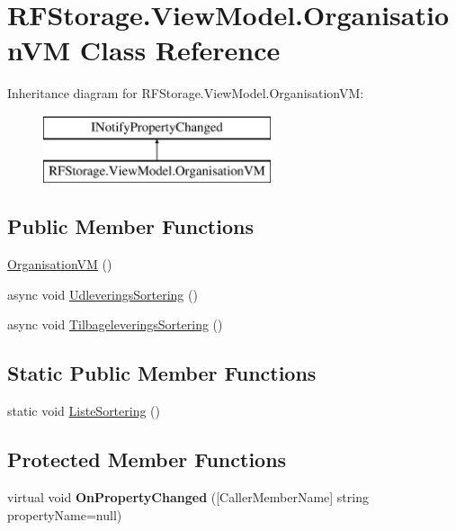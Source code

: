 \hypertarget{class_r_f_storage_1_1_view_model_1_1_organisation_v_m}{}\section{R\+F\+Storage.\+View\+Model.\+Organisation\+VM Class Reference}
\label{class_r_f_storage_1_1_view_model_1_1_organisation_v_m}
Inheritance diagram for R\+F\+Storage.\+View\+Model.\+Organisation\+VM\+:\begin{figure}[H]
\begin{center}
\leavevmode
\includegraphics[height=2.000000cm]{class_r_f_storage_1_1_view_model_1_1_organisation_v_m}
\end{center}
\end{figure}
\subsection*{Public Member Functions}
\begin{DoxyCompactItemize}
\item 
\mbox{\hyperlink{class_r_f_storage_1_1_view_model_1_1_organisation_v_m_ad360a4cd203de421d6ccf82e7745ee52}{Organisation\+VM}} ()
\item 
async void \mbox{\hyperlink{class_r_f_storage_1_1_view_model_1_1_organisation_v_m_a666838928a19d3aad732e206966d0418}{Udleverings\+Sortering}} ()
\item 
async void \mbox{\hyperlink{class_r_f_storage_1_1_view_model_1_1_organisation_v_m_a3c6fd198321166706a88a326d6a80334}{Tilbageleverings\+Sortering}} ()
\end{DoxyCompactItemize}
\subsection*{Static Public Member Functions}
\begin{DoxyCompactItemize}
\item 
static void \mbox{\hyperlink{class_r_f_storage_1_1_view_model_1_1_organisation_v_m_a6a8f7bb9ab51cb0291e3fa3e23bdb6f6}{Liste\+Sortering}} ()
\end{DoxyCompactItemize}
\subsection*{Protected Member Functions}
\begin{DoxyCompactItemize}
\item 
\mbox{\label{class_r_f_storage_1_1_view_model_1_1_organisation_v_m_ac9014971098fd910399449d2f0797d0c}} 
virtual void {\bfseries On\+Property\+Changed} (\mbox{[}Caller\+Member\+Name\mbox{]} string property\+Name=null)
\end{DoxyCompactItemize}

